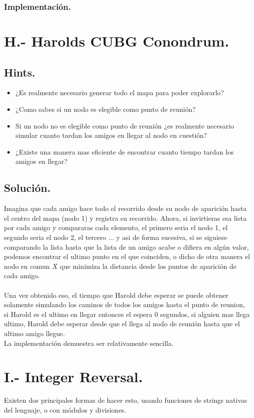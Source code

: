 \documentclass[12pt,letterpaper,titlepage]{article}
\begin{document}
\subsubsection{Implementación.}

\clearpage\section{H.- Harolds CUBG Conondrum.}
\subsection{Hints.}
\begin{itemize}
	\item ¿Es realmente necesario generar todo el mapa para poder explorarlo? 
	\item ¿Como sabes si un nodo es elegible como punto de reunión?
	\item Si un nodo no es elegible como punto de reunión ¿es realmente necesario simular cuanto tardan los amigos en llegar al nodo en cuestión?
	\item ¿Existe una manera mas eficiente de encontrar cuanto tiempo tardan los amigos en llegar?
\end{itemize}
\subsection{Solución.}
Imagina que cada amigo hace todo el recorrido desde su nodo de aparición hasta el centro del mapa (nodo 1) y registra su recorrido. Ahora, si invirtieras esa lista por cada amigo y compararas cada elemento, el primero seria el nodo 1, el segundo seria el nodo 2, el tercero ... y asi de forma sucesiva, si se siguiese comparando la lista hasta que la lista de un amigo acabe o difiera en algún valor, podemos encontrar el ultimo punto en el que coinciden, o dicho de otra manera el nodo en comun $X$ que minimiza la distancia desde los puntos de aparición de cada amigo.
\\~\\
Una vez obtenido eso, el tiempo que Harold debe esperar se puede obtener solamente simulando los caminos de todos los amigos hasta el punto de reunion, si Harold es el ultimo en llegar entonces el espera 0 segundos, si alguien mas llega ultimo, Harold debe esperar desde que el llega al nodo de reunión hasta que el ultimo amigo llegue.
\\
La implementación demuestra ser relativamente sencilla.

\clearpage\section{I.- Integer Reversal.}
Existen dos principales formas de hacer esto, usando funciones de strings nativas del lenguaje, o con módulos y divisiones.
\end{document}
